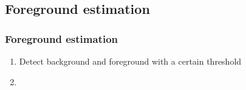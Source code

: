 \subsection{Foreground estimation}
\begin{frame}
  \frametitle{Foreground estimation}
\begin{enumerate}
\item Detect background and foreground with a certain threshold
\item

\end{enumerate}

  
  
\end{frame}
